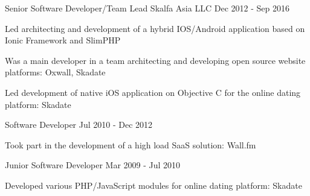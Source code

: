 \begin{cventries}
  \cventry
    {Senior Software Developer/Team Lead} %
    {Skalfa Asia LLC} %
    {} %
    {Dec 2012 - Sep 2016} %
    {
      \begin{cvitems}
        \item Led architecting and development of a hybrid IOS/Android application based on Ionic Framework and SlimPHP
        \item Was a main developer in a team architecting and developing open source website platforms: Oxwall, Skadate
        \item Led development of native iOS application on Objective C for the online dating platform: Skadate
      \end{cvitems}
    }

  \cventry
    {Software Developer} %
    {} %
    {} %
    {Jul 2010 - Dec 2012} %
    {
      \begin{cvitems}
        \item Took part in the development of a high load SaaS solution: Wall.fm
      \end{cvitems}
    }

  \cventry
    {Junior Software Developer} %
    {} %
    {} %
    {Mar 2009 - Jul 2010} %
    {
      \begin{cvitems}
        \item Developed various PHP/JavaScript modules for online dating platform: Skadate
      \end{cvitems}
    }

\end{cventries}
